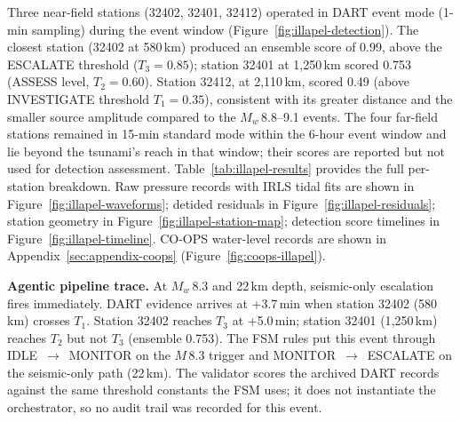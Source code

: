 \documentclass{article}
\begin{document}
Three near-field stations (32402, 32401, 32412) operated in DART
event mode (1-min sampling) during the event window
(Figure~\ref{fig:illapel-detection}).
The closest station (32402 at 580\,km) produced an ensemble score of
0.99, above the ESCALATE threshold ($T_3 = 0.85$);
station 32401 at 1{,}250\,km scored 0.753 (ASSESS level, $T_2 = 0.60$).
Station 32412, at 2{,}110\,km, scored 0.49 (above INVESTIGATE
threshold $T_1 = 0.35$), consistent with its greater distance
and the smaller source amplitude compared to the $M_w$\,8.8--9.1
events.  The four far-field stations remained in 15-min standard mode
within the 6-hour event window and lie beyond the tsunami's reach in
that window; their scores are reported but not used for detection
assessment.
Table~\ref{tab:illapel-results} provides the full per-station breakdown.
Raw pressure records with IRLS tidal fits are shown in
Figure~\ref{fig:illapel-waveforms}; detided residuals in
Figure~\ref{fig:illapel-residuals}; station geometry in
Figure~\ref{fig:illapel-station-map}; detection score timelines in
Figure~\ref{fig:illapel-timeline}.
CO-OPS water-level records are shown in
Appendix~\ref{sec:appendix-coops} (Figure~\ref{fig:coops-illapel}).

\noindent\textbf{Agentic pipeline trace.}
At $M_w$\,8.3 and 22\,km depth, seismic-only escalation fires
immediately.  DART evidence arrives at +3.7\,min when
station 32402 (580\,km) crosses $T_1$.  Station 32402 reaches
$T_3$ at +5.0\,min; station 32401 (1{,}250\,km) reaches
$T_2$ but not $T_3$ (ensemble 0.753).
The FSM rules put this event through IDLE~$\to$~MONITOR on the
$M$\,8.3 trigger and MONITOR~$\to$~ESCALATE on the seismic-only path
(22\,km).  The validator scores the archived DART records against
the same threshold constants the FSM uses; it does not instantiate the
orchestrator, so no audit trail was recorded for this event.
\end{document}
